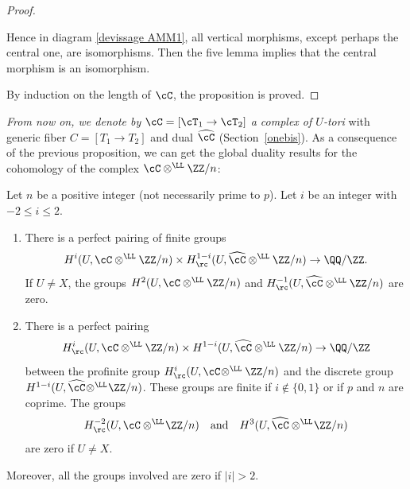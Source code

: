 \begin{proof}
\begin{itemize}
Hence in diagram \eqref{devissage AMM1}, all vertical morphisms, except perhaps the central one, are isomorphisms. Then the five lemma implies that the central morphism is an isomorphism.
\end{itemize}
By induction on the length of $\cC$, the proposition is proved.
\end{proof}

\emph{From now on, we denote by $\cC=[\cT_1 \to \cT_2]$ a complex of $U$-tori}
with generic fiber $C=[T_1 \to T_2]$ and dual $\widehat \cC$ (\cf Section~\ref{onebis}).
As a consequence of the previous proposition, we can get the global duality results for the cohomology of the complex $\cC \otimes^\LL \ZZ /n$:

\begin{prop} \label{avfini}
Let $n$ be a positive integer (not necessarily prime to $p$).
Let $i$ be an integer with $-2 \leq i \leq 2$.
\begin{enumerate}
\item\label{avfini1} There is a perfect pairing of finite groups\vspace*{-3pt}
\[
H^i(U, \cC \otimes^\LL \ZZ/n) \times H^{1-i}_\rc(U,
\widehat \cC \otimes^\LL \ZZ/n) \to \QQ/\ZZ.
\]
If $U \neq X$, the groups $H^2(U, \cC \otimes^\LL \ZZ/n)$ and
$H^{-1}_\rc(U, \widehat \cC \otimes^\LL \ZZ/n)$ are zero.
\item\label{avfini2} There is a perfect pairing\vspace*{-3pt}
\[
H^i_\rc(U, \cC \otimes^\LL \ZZ/n) \times H^{1-i}(U,
\widehat \cC \otimes^\LL \ZZ/n) \to \QQ/\ZZ
\]
between the profinite group $H^i_\rc(U, \cC\!\otimes^\LL\ZZ/n)$
and the discrete group \hbox{$H^{1-i}(U, \widehat \cC\!\otimes^\LL\!\ZZ/n)$}.
These groups are finite if $i\!\notin\!\{0, 1\}$ or if $p$ and $n$ are
coprime. The groups\vspace*{-3pt}
\[
H^{-2}_\rc(U,\cC\otimes^\LL\!\ZZ/n)\quad\text{and}\quad
H^3(U,\widehat \cC \otimes^\LL\!\ZZ/n)
\]
are zero if
$U \neq X$.
\end{enumerate}

Moreover, all the groups involved are zero if $\vert i \vert >2$.
\end{prop}

